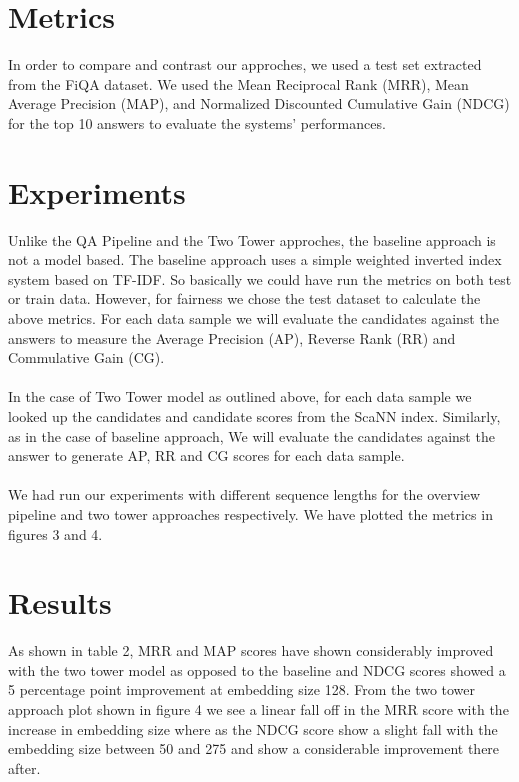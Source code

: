\documentclass[11pt,a4paper]{article}
\begin{document}
\section{Metrics}
In order to compare and contrast our approches, we used a test set extracted from the FiQA dataset. We used the Mean Reciprocal Rank (MRR), Mean Average Precision (MAP), and Normalized Discounted Cumulative Gain (NDCG) for the top 10 answers to evaluate the systems’ performances. 


\section{Experiments}
Unlike the QA Pipeline and the Two Tower approches, the baseline approach is not a model based. The baseline approach uses a simple weighted inverted index system based on TF-IDF. So basically we could have run the metrics on both test or train data. However, for fairness we chose the test dataset to calculate the above metrics. For each data sample we will evaluate the candidates against the answers to measure the Average Precision (AP), Reverse Rank (RR) and Commulative Gain (CG).

\paragraph{}
In the case of Two Tower model as outlined above, for each data sample we looked up the candidates and candidate scores from the ScaNN index. Similarly, as in the case of baseline approach, We will evaluate the candidates against the answer to generate AP, RR and CG scores for each data sample.

\paragraph{}
We had run our experiments with different sequence lengths for the overview pipeline and two tower approaches respectively. We have plotted the metrics in figures 3 and 4.

\section{Results}
As shown in table 2, MRR and MAP scores have shown considerably improved with the two tower model as opposed to the baseline and NDCG scores showed a 5 percentage point improvement at embedding size 128. From the two tower approach plot shown in figure 4 we see a linear fall off in the MRR score with the increase in embedding size where as the NDCG score show a slight fall with the embedding size between 50 and 275 and show a considerable improvement there after. 
\end{document}
